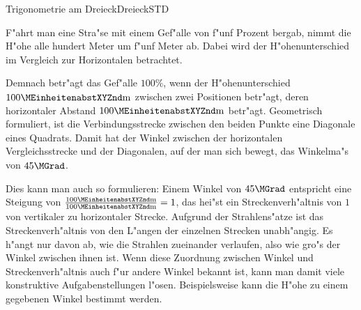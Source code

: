 \begin{MXContent}{Trigonometrie am Dreieck}{Dreieck}{STD}

F"ahrt man eine Stra"se mit einem Gef"alle von f"unf Prozent bergab, 
nimmt die H"ohe alle hundert Meter um f"unf Meter ab. Dabei wird der 
H"ohenunterschied im Vergleich zur Horizontalen betrachtet.

\begin{center}
\end{center}

Demnach betr"agt das Gef"alle $100\%$, wenn der H"ohenunterschied
$100\MEinheit{m}$ zwischen zwei Positionen betr"agt, deren horizontaler 
Abstand $100\MEinheit{m}$ betr"agt. Geometrisch formuliert, ist 
die Verbindungsstrecke zwischen den beiden Punkte eine Diagonale 
eines Quadrats. Damit hat der Winkel zwischen der horizontalen 
Vergleichsstrecke und der Diagonalen, auf der man sich bewegt, das
Winkelma"s von $45\MGrad$. 

\begin{center}
\end{center}

Dies kann man auch so formulieren: Einem Winkel von $45\MGrad$ entspricht
eine Steigung von $\frac{100\MEinheit{m}}{100\MEinheit{m}} = 1$, das hei"st 
ein Streckenverh"altnis von $1$ von vertikaler zu horizontaler Strecke. 
Aufgrund der Strahlens"atze ist das Streckenverh"altnis von den L"angen der 
einzelnen Strecken unabh"angig. Es h"angt nur davon ab, wie die Strahlen
zueinander verlaufen, also wie gro"s der Winkel zwischen ihnen ist.
Wenn diese Zuordnung zwischen Winkel und Streckenverh"altnis auch f"ur andere
Winkel bekannt ist, kann man damit viele konstruktive Aufgabenstellungen 
l"osen. 
Beispielsweise kann die H"ohe zu einem gegebenen Winkel bestimmt werden.


\end{MXContent}
